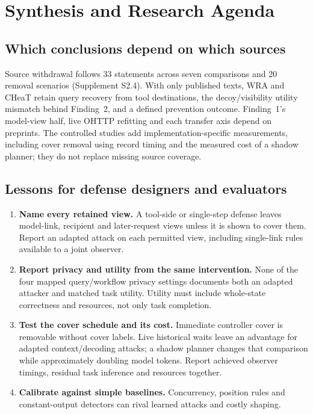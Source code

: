 \section{Synthesis and Research Agenda}\label{sec:agenda}
\subsection{Which conclusions depend on which sources}\label{sec:sensitivity}
Source withdrawal follows 33 statements across seven comparisons and 20 removal scenarios (Supplement S2.4). With only published texts, WRA and CHeaT retain query recovery from tool destinations, the decoy/visibility utility mismatch behind Finding~2, and a defined prevention outcome. Finding~1's model-view half, live OHTTP refitting and each transfer axis depend on preprints. The controlled studies add implementation-specific measurements, including cover removal using record timing and the measured cost of a shadow planner; they do not replace missing source coverage.

\subsection{Lessons for defense designers and evaluators}
\begin{enumerate}
\item \textbf{Name every retained view.} A tool-side or single-step defense leaves model-link, recipient and later-request views unless it is shown to cover them. Report an adapted attack on each permitted view, including single-link rules available to a joint observer.
\item \textbf{Report privacy and utility from the same intervention.} None of the four mapped query/workflow privacy settings documents both an adapted attacker and matched task utility. Utility must include whole-state correctness and resources, not only task completion.
\item \textbf{Test the cover schedule and its cost.} Immediate controller cover is removable without cover labels. Live historical waits leave an advantage for adapted context/decoding attacks; a shadow planner changes that comparison while approximately doubling model tokens. Report achieved observer timings, residual task inference and resources together.
\item \textbf{Calibrate against simple baselines.} Concurrency, position rules and constant-output detectors can rival learned attacks and costly shaping.
\end{enumerate}

